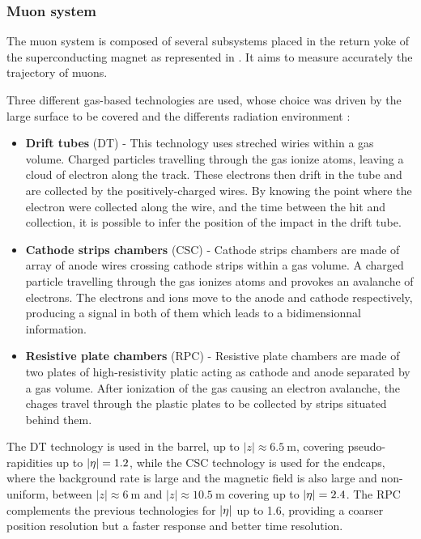             \subsubsection{Muon system}

        The muon system is composed of several subsystems placed in the return yoke of
        the superconducting magnet as represented in . It aims to
        measure accurately the trajectory of muons.


        Three different gas-based technologies are used, whose choice was driven by the
        large surface to be covered and the differents radiation environment :
        \begin{itemize}
            \item \textbf{Drift tubes} (DT) - This technology uses streched wiries within
                a gas volume. Charged particles travelling through the gas ionize atoms,
                leaving a cloud of electron along the track. These electrons then drift
                in the tube and are collected by the positively-charged wires. By knowing
                the point where the electron were collected along the wire, and the
                time between the hit and collection, it is possible to infer the position
                of the impact in the drift tube.
            \item \textbf{Cathode strips chambers} (CSC) - Cathode strips chambers are
                made of array of anode wires crossing cathode strips within a gas volume.
                A charged particle travelling through the gas ionizes atoms and provokes an
                avalanche of electrons. The electrons and ions move to the anode and
                cathode respectively, producing a signal in both of them which leads to
                a bidimensionnal information.
            \item \textbf{Resistive plate chambers} (RPC) - Resistive plate chambers are
                made of two plates of high-resistivity platic acting as cathode and anode
                separated by a gas volume. After ionization of the gas causing an
                electron avalanche, the chages travel through the plastic plates to be
                collected by strips situated behind them.
        \end{itemize}

        The DT technology is used in the barrel, up to $\left|z\right| \approx 6.5~\text{m}$, covering
        pseudo-rapidities up to $\left| \eta \right| = 1.2$, while the CSC technology is used for the endcaps,
        where the background rate is large and the magnetic field is also large and non-uniform,
        between $\left|z\right| \approx 6~\text{m}$ and $\left|z\right| \approx 10.5~\text{m}$
        covering up to $\left| \eta \right| = 2.4$. The RPC complements the previous technologies for
        $\left| \eta \right|$ up to 1.6, providing a coarser position resolution but a faster response
        and better time resolution.

